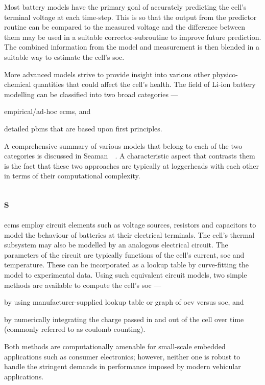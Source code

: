 Most battery  models have the primary  goal of accurately predicting  the cell's
terminal  voltage  at each  time-step.  This  is so  that  the  output from  the
predictor routine  can be compared  to the  measured voltage and  the difference
between them  may be used in  a suitable corrector-subroutine to  improve future
prediction.  The combined  information from  the model  and measurement  is then
blended in a suitable way to estimate the cell's \gls{soc}.

More   advanced  models   strive   to  provide   insight   into  various   other
physico-chemical quantities  that could affect  the cell's health. The  field of
Li-ion battery modelling can be classified into two broad categories
---
\begin{enumerate*}[label=\roman*)]
    \item empirical/ad-hoc \glspl{ecm}, and
    \item detailed  \glspl{pbm} that are based  upon first principles.
\end{enumerate*}
A  comprehensive summary  of  various models  that  belong to  each  of the  two
categories  is  discussed  in Seaman~\etal~\cite{Seaman2014}.  A  characteristic
aspect that contrasts  them is the fact that these  two approaches are typically
at loggerheads with each other in terms of their computational complexity.

\subsection{s}\label{subsec:ecms}

\glspl{ecm}  employ circuit  elements  such as  voltage  sources, resistors  and
capacitors to  model the behaviour  of batteries at their  electrical terminals.
The cell's  thermal subsystem may  also be  modelled by an  analogous electrical
circuit. The  parameters of the  circuit are  typically functions of  the cell's
current, \gls{soc} and  temperature. These can be incorporated as  a lookup table by
curve-fitting  the model  to experimental  data. Using  such equivalent  circuit
models, two simple methods are available to compute the cell's \gls{soc} ---
\begin{enumerate*}[label=\itshape\alph*\upshape)]
    \item by using manufacturer-supplied  lookup table or graph of \gls{ocv} versus \gls{soc}, and
    \item by numerically integrating the charge passed in and out of the cell over time (commonly referred to as coulomb counting).
\end{enumerate*}
Both methods are computationally  amenable for small-scale embedded applications
such as  consumer  electronics;  however,  neither  one is  robust  to  handle  the
stringent demands in performance imposed  by modern vehicular applications.


